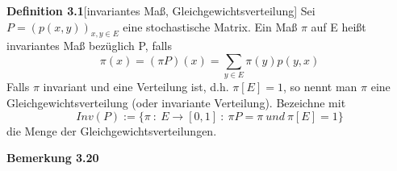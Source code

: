 \textbf{Definition 3.1}[invariantes Maß, Gleichgewichtsverteilung]
Sei $P = (p(x,y))_{x,y \in E}$ eine stochastische Matrix. Ein Maß $\pi$ auf E heißt invariantes Maß bezüglich P, falls
\begin{equation*}
\pi (x) = (\pi P)(x) = \sum_{y \in E} \pi (y) p(y,x)
\end{equation*}
Falls $\pi$ invariant und eine Verteilung ist, d.h. $\pi[E] = 1$, so nennt man $\pi$ eine Gleichgewichtsverteilung (oder invariante Verteilung). Bezeichne mit
\begin{equation*}
Inv(P) := \lbrace \pi \: : \: E \to [0,1] \: : \: \pi P = \pi \: und \: \pi[E] = 1 \rbrace
\end{equation*}
die Menge der Gleichgewichtsverteilungen.

\clearpairofpagestyles
\ohead{\pagemark}
\pagestyle{scrheadings}
\textbf{Bemerkung 3.20}


